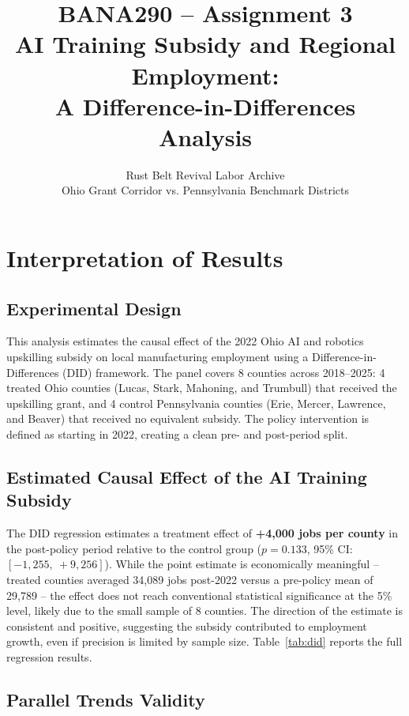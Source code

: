 \documentclass[12pt]{article}
\title{\textbf{BANA290 -- Assignment 3} \\
       \large AI Training Subsidy and Regional Employment: \\
       A Difference-in-Differences Analysis}
\author{Rust Belt Revival Labor Archive \\
        Ohio Grant Corridor vs. Pennsylvania Benchmark Districts}
\date{}
\begin{document}
\maketitle

\section*{Interpretation of Results}

\subsection*{Experimental Design}

This analysis estimates the causal effect of the 2022 Ohio AI and
robotics upskilling subsidy on local manufacturing employment using
a Difference-in-Differences (DID) framework. The panel covers 8
counties across 2018--2025: 4 treated Ohio counties (Lucas, Stark,
Mahoning, and Trumbull) that received the upskilling grant, and 4
control Pennsylvania counties (Erie, Mercer, Lawrence, and Beaver)
that received no equivalent subsidy. The policy intervention is
defined as starting in 2022, creating a clean pre- and post-period
split.

\subsection*{Estimated Causal Effect of the AI Training Subsidy}

The DID regression estimates a treatment effect of
\textbf{+4,000 jobs per county} in the post-policy period relative
to the control group ($p = 0.133$, 95\% CI: $[-1{,}255,\ +9{,}256]$).
While the point estimate is economically meaningful -- treated
counties averaged 34,089 jobs post-2022 versus a pre-policy mean of
29,789 -- the effect does not reach conventional statistical
significance at the 5\% level, likely due to the small sample of
8 counties. The direction of the estimate is consistent and positive,
suggesting the subsidy contributed to employment growth, even if
precision is limited by sample size. Table~\ref{tab:did} reports
the full regression results.

\subsection*{Parallel Trends Validity}
\end{document}
